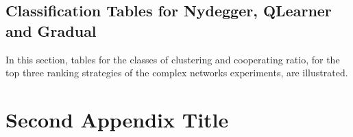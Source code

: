 \section{Classification Tables for Nydegger, QLearner and Gradual}
\label{append:class-top-strategies}
In this section, tables for the classes of clustering and cooperating ratio,
for the top three ranking strategies of the complex networks experiments, are
illustrated.

\chapter{Second Appendix Title}

\lipsum[1-2]
